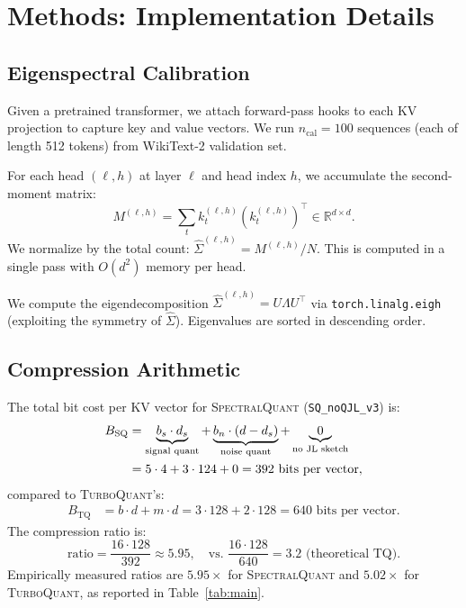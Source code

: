\documentclass[11pt]{article}
\newcommand{\TQ}{\textsc{TurboQuant}}
\newcommand{\SQ}{\textsc{SpectralQuant}}
\newcommand{\R}{\mathbb{R}}
\begin{document}
\section{Methods: Implementation Details}
\label{sec:methods}

\subsection{Eigenspectral Calibration}

Given a pretrained transformer, we attach forward-pass hooks to each KV
projection to capture key and value vectors.  We run $n_{\mathrm{cal}} = 100$
sequences (each of length 512 tokens) from WikiText-2 validation set.

For each head $(\ell, h)$ at layer $\ell$ and head index $h$, we accumulate
the second-moment matrix:
\[
  M^{(\ell,h)} = \sum_{t} k_t^{(\ell,h)} (k_t^{(\ell,h)})^\top \in \R^{d \times d}.
\]
We normalize by the total count: $\hat{\Sigma}^{(\ell,h)} = M^{(\ell,h)} / N$.
This is computed in a single pass with $O(d^2)$ memory per head.

We compute the eigendecomposition $\hat{\Sigma}^{(\ell,h)} = U \Lambda U^\top$
via \texttt{torch.linalg.eigh} (exploiting the symmetry of $\hat{\Sigma}$).
Eigenvalues are sorted in descending order.

\subsection{Compression Arithmetic}
\label{subsec:compression_arithmetic}

The total bit cost per KV vector for \SQ{} (\texttt{SQ\_noQJL\_v3}) is:
\begin{align}
  B_{\mathrm{SQ}} &= \underbrace{b_s \cdot d_s}_{\text{signal quant}}
    + \underbrace{b_n \cdot (d - d_s)}_{\text{noise quant}}
    + \underbrace{0}_{\text{no JL sketch}} \notag \\
  &= 5 \cdot 4 + 3 \cdot 124 + 0 = 392 \text{ bits per vector},
\end{align}
compared to \TQ{}'s:
\begin{align}
  B_{\mathrm{TQ}} &= b \cdot d + m \cdot d = 3 \cdot 128 + 2 \cdot 128 = 640 \text{ bits per vector}.
\end{align}
The compression ratio is:
\[
  \mathrm{ratio} = \frac{16 \cdot 128}{392} \approx 5.95, \quad
  \text{vs.\ } \frac{16 \cdot 128}{640} = 3.2 \text{ (theoretical TQ)}.
\]
Empirically measured ratios are $5.95\times$ for \SQ{} and $5.02\times$ for
\TQ{}, as reported in Table~\ref{tab:main}.
\end{document}
